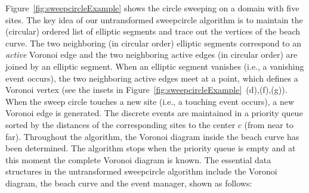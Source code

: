 Figure~\ref{fig:sweepcircleExample} shows the circle sweeping on a
domain with five sites. The key idea of our untransformed sweepcircle algorithm
is to maintain the (circular) ordered list of elliptic segments and
trace out the vertices of the beach curve. The two neighboring (in
circular order) elliptic segments correspond to an {\em active}
Voronoi edge and the two neighboring active edges (in circular
order) are joined by an elliptic segment. When an elliptic segment
vanishes (i.e., a vanishing event occurs), the two neighboring
active edges meet at a point, which defines a Voronoi vertex (see
the insets in Figure~\ref{fig:sweepcircleExample}~(d),(f),(g)). When
the sweep circle touches a new site (i.e., a touching event occurs),
a new Voronoi edge is generated. The discrete events are maintained
in a priority queue sorted by the distances of the corresponding
sites to the center $c$ (from near to far). Throughout the
algorithm, the Voronoi diagram inside the beach curve has been
determined. The algorithm stops when the priority queue is empty and
at this moment the complete Voronoi diagram is known. The essential
data structures in the untransformed sweepcircle algorithm include the Voronoi
diagram, the beach curve and the event manager, shown as follows:

